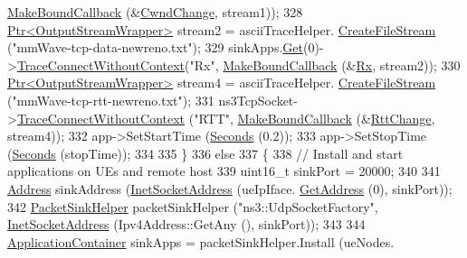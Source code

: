 \begin{DoxyCode}
      \hyperlink{group__makeboundcallback_ga1725d6362e6065faa0709f7c93f8d770}{MakeBoundCallback} (&\hyperlink{mmwave-tcp-raytracing-example_8cc_a029700a26394b63e7e4f8fe0dc2a3e0d}{CwndChange}, stream1));
328                 \hyperlink{classns3_1_1Ptr}{Ptr<OutputStreamWrapper>} stream2 = asciiTraceHelper.
      \hyperlink{classns3_1_1AsciiTraceHelper_a44960bf2ca32835024eaedd26d1c4f94}{CreateFileStream} (\textcolor{stringliteral}{"mmWave-tcp-data-newreno.txt"});
329                 sinkApps.\hyperlink{classns3_1_1ApplicationContainer_a9e565807abd4213a56566a7ccd8d7509}{Get}(0)->\hyperlink{classns3_1_1ObjectBase_a1be45f6fd561e75dcac9dfa81b2b81e4}{TraceConnectWithoutContext}(\textcolor{stringliteral}{"Rx"},
      \hyperlink{group__makeboundcallback_ga1725d6362e6065faa0709f7c93f8d770}{MakeBoundCallback} (&\hyperlink{mmwave-tcp-raytracing-example_8cc_a44926b91325d01c8749a8e4728a65087}{Rx}, stream2));
330                 \hyperlink{classns3_1_1Ptr}{Ptr<OutputStreamWrapper>} stream4 = asciiTraceHelper.
      \hyperlink{classns3_1_1AsciiTraceHelper_a44960bf2ca32835024eaedd26d1c4f94}{CreateFileStream} (\textcolor{stringliteral}{"mmWave-tcp-rtt-newreno.txt"});
331                 ns3TcpSocket->\hyperlink{classns3_1_1ObjectBase_a1be45f6fd561e75dcac9dfa81b2b81e4}{TraceConnectWithoutContext} (\textcolor{stringliteral}{"RTT"}, 
      \hyperlink{group__makeboundcallback_ga1725d6362e6065faa0709f7c93f8d770}{MakeBoundCallback} (&\hyperlink{mmwave-tcp-raytracing-example_8cc_a9490f3a2b4f07bb82ec1024befcb57a8}{RttChange}, stream4));
332                 app->SetStartTime (\hyperlink{group__timecivil_ga33c34b816f8ff6628e33d5c8e9713b9e}{Seconds} (0.2));
333                 app->SetStopTime (\hyperlink{group__timecivil_ga33c34b816f8ff6628e33d5c8e9713b9e}{Seconds} (stopTime));
334 
335         \}
336         \textcolor{keywordflow}{else}
337         \{
338                 \textcolor{comment}{// Install and start applications on UEs and remote host}
339                 uint16\_t sinkPort = 20000;
340 
341                 \hyperlink{classns3_1_1Address}{Address} sinkAddress (\hyperlink{classns3_1_1InetSocketAddress}{InetSocketAddress} (ueIpIface.
      \hyperlink{classns3_1_1Ipv4InterfaceContainer_ae63208dcd222be986822937ee4aa828c}{GetAddress} (0), sinkPort));
342                 \hyperlink{classns3_1_1PacketSinkHelper}{PacketSinkHelper} packetSinkHelper (\textcolor{stringliteral}{"ns3::UdpSocketFactory"}, 
      \hyperlink{classns3_1_1InetSocketAddress}{InetSocketAddress} (Ipv4Address::GetAny (), sinkPort));
343 
344                 \hyperlink{classns3_1_1ApplicationContainer}{ApplicationContainer} sinkApps = packetSinkHelper.Install (ueNodes.

\end{DoxyCode}
